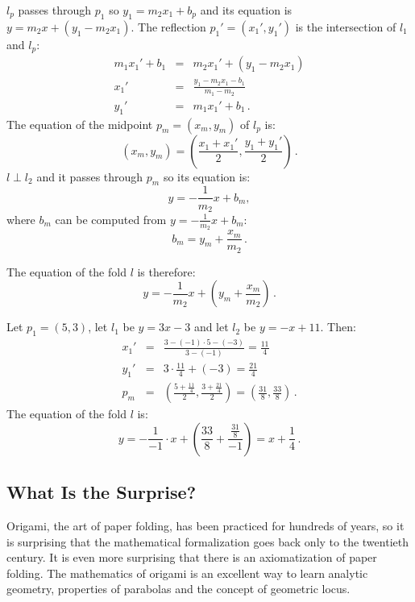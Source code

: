 $l_p$ passes through $p_1$ so $y_1=m_2x_1+b_p$ and its equation is $y=m_2x+(y_1-m_2x_1)$. The reflection $p_1'=(x_1',y_1')$ is the intersection of $l_1$ and $l_p$:
\begin{eqnarray*}
m_1x_1'+b_1&=&m_2x_1'+(y_1-m_2x_1)\\
x_1'&=&\frac{y_1-m_2x_1-b_1}{m_1-m_2}\\
y_1'&=&m_1x_1'+b_1\,.
\end{eqnarray*}
The equation of the midpoint $p_m=(x_m,y_m)$ of $l_p$ is:
\[
(x_m,y_m)=\left(\frac{x_1+x_1'}{2},\frac{y_1+y_1'}{2}\right)\,.
\]
$l\perp l_2$ and it passes through $p_m$ so its equation is:
\[
y=-\frac{1}{m_2}x+b_m,
\]
where $b_m$ can be computed from $y=-\displaystyle\frac{1}{m_2}x+b_m$:
\[b_m=y_m+\frac{x_m}{m_2}\,.\]

\newpage

The equation of the fold $l$ is therefore:
\[
y=-\frac{1}{m_2}x+\left(y_m+\displaystyle\frac{x_m}{m_2}\right)\,.
\]
\begin{example}
Let $p_1=(5,3)$, let $l_1$ be $y=3x-3$ and let $l_2$ be $y=-x+11$. Then:
\begin{eqnarray*}
x_1'&=&\frac{3-(-1)\cdot 5-(-3)}{3-(-1)}=\frac{11}{4}\\
y_1'&=&3\cdot \frac{11}{4} + (-3)=\frac{21}{4}\\
p_m&=&\left(\frac{5+\displaystyle\frac{11}{4}}{2},\frac{3+\displaystyle\frac{21}{4}}{2}\right)=\left(\frac{31}{8},\frac{33}{8}\right)\,.
\end{eqnarray*}
The equation of the fold $l$ is:
\[
y=-\frac{1}{-1}\cdot x+\left(\frac{33}{8}+\frac{\displaystyle\frac{31}{8}}{-1}\right)=x+\frac{1}{4}\,.
\]
\end{example}

\vspace{-2ex}

\subsection*{What Is the Surprise?}

Origami, the art of paper folding, has been practiced for hundreds of years, so it is surprising that the mathematical formalization goes back only to the twentieth century. It is even more surprising that there is an axiomatization of paper folding. The mathematics of origami is an excellent way to learn analytic geometry, properties of parabolas and the concept of geometric locus.

\vspace{-2ex}

